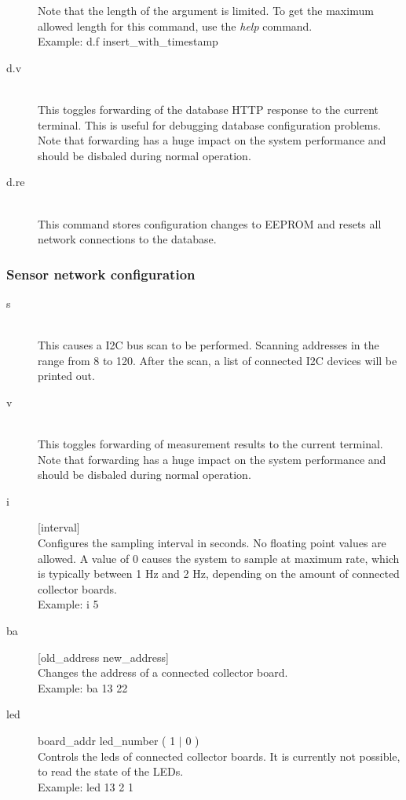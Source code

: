 \documentclass[a4paper]{scrreprt}
\begin{document}
\begin{description}
    Note that the length of the argument is limited. To get the maximum allowed
    length for this command, use the \emph{help} command.\\
    Example: d.f insert\_with\_timestamp
  \item[d.v]\hspace{1cm}\\
    This toggles forwarding of the database HTTP response to the current terminal.
    This is useful for debugging database configuration problems.\\
    Note that forwarding has a huge impact on the system performance and should be
    disbaled during normal operation.
  \item[d.re]\hspace{1cm}\\
    This command stores configuration changes to EEPROM and resets all network
    connections to the database.
\end{description}
\subsubsection{Sensor network configuration}
\begin{description}
  \item[s] \hspace{1cm}\\
    This causes a I2C bus scan to be performed. Scanning addresses in the range from
    8 to 120. After the scan, a list of connected I2C devices will be printed out.
  \item[v] \hspace{1cm}\\
    This toggles forwarding of measurement results to the current terminal.\\
    Note that forwarding has a huge impact on the system performance and should be
    disbaled during normal operation.
  \item[i] [interval]\\
    Configures the sampling interval in seconds. No floating point values are allowed.
    A value of 0 causes the system to sample at maximum rate, which is typically
    between 1 Hz and 2 Hz, depending on the amount of connected collector boards.\\
    Example: i 5
  \item[ba] [old\_address new\_address]\\
    Changes the address of a connected collector board.\\
    Example: ba 13 22
  \item[led] board\_addr led\_number ( 1 $|$ 0 )\\
    Controls the leds of connected collector boards. It is currently not possible, to read the state of the LEDs.\\
    Example: led 13 2 1
\end{description}
\end{document}
